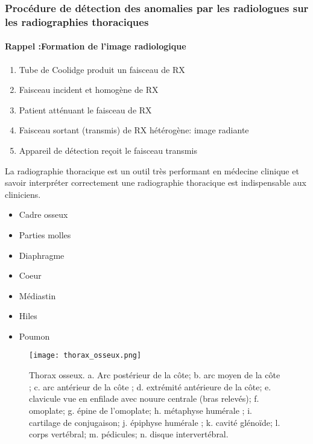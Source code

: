             \subsubsection{Procédure de détection des anomalies par les radiologues sur les radiographies thoraciques}
            \paragraph*{Rappel :Formation de l’image radiologique}
            \begin{enumerate}
                \item Tube de Coolidge produit un faisceau de RX
                \item Faisceau incident et homogène de RX
                \item Patient atténuant le faisceau de RX
                \item Faisceau sortant (transmis) de RX hétérogène: image radiante
                \item Appareil de détection reçoit le faisceau transmis
            \end{enumerate}
            La radiographie thoracique est un outil très performant en médecine clinique et savoir interpréter correctement une radiographie thoracique est indispensable aux cliniciens.
            \begin{multicols}{2}
                \begin{itemize}[label=$\bullet$]
                    \item Cadre osseux
                    \item Parties molles
                    \item Diaphragme
                    \item Coeur
                    \item Médiastin
                    \item Hiles
                    \item Poumon
                \end{itemize}
            \end{multicols}
            \begin{figure}[h]
                \centering
                \texttt{[image: thorax\_osseux.png]}
                \caption{Thorax osseux. a. Arc postérieur de la côte; b. arc moyen de la côte ; c. arc antérieur de la côte ; d. extrémité antérieure de la côte; e. clavicule vue en enfilade avec nouure centrale (bras relevés); f. omoplate; g. épine de l'omoplate; h. métaphyse humérale ; i. cartilage de conjugaison; j. épiphyse humérale ; k. cavité glénoïde; l. corps vertébral; m. pédicules; n. disque intervertébral.
                }\label{fig:thorax}
            \end{figure}
           
